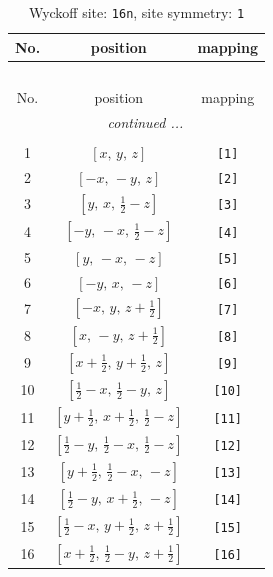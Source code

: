 \documentclass[fleqn,8pt]{jsarticle}
\begin{document}
\begin{longtable}{ccc}
\caption{Wyckoff site: {\tt 16n}, site symmetry: {\tt 1}}
 \\
 \hline \hline
No. & position & mapping \\ \hline \endfirsthead

\multicolumn{2}{l}{\tablename\ \thetable{}} \\
 \hline \hline
No. & position & mapping \\ \hline \endhead

 \hline \hline
\multicolumn{2}{r}{\footnotesize\it continued ...} \\ \endfoot

 \hline \hline
\multicolumn{2}{r}{} \\ \endlastfoot

1 & $\left[ x,\, y,\, z \right]$ & {\tt [1]} \\ \hline
2 & $\left[ - x,\, - y,\, z \right]$ & {\tt [2]} \\ \hline
3 & $\left[ y,\, x,\, \frac{1}{2} - z \right]$ & {\tt [3]} \\ \hline
4 & $\left[ - y,\, - x,\, \frac{1}{2} - z \right]$ & {\tt [4]} \\ \hline
5 & $\left[ y,\, - x,\, - z \right]$ & {\tt [5]} \\ \hline
6 & $\left[ - y,\, x,\, - z \right]$ & {\tt [6]} \\ \hline
7 & $\left[ - x,\, y,\, z + \frac{1}{2} \right]$ & {\tt [7]} \\ \hline
8 & $\left[ x,\, - y,\, z + \frac{1}{2} \right]$ & {\tt [8]} \\ \hline
9 & $\left[ x + \frac{1}{2},\, y + \frac{1}{2},\, z \right]$ & {\tt [9]} \\ \hline
10 & $\left[ \frac{1}{2} - x,\, \frac{1}{2} - y,\, z \right]$ & {\tt [10]} \\ \hline
11 & $\left[ y + \frac{1}{2},\, x + \frac{1}{2},\, \frac{1}{2} - z \right]$ & {\tt [11]} \\ \hline
12 & $\left[ \frac{1}{2} - y,\, \frac{1}{2} - x,\, \frac{1}{2} - z \right]$ & {\tt [12]} \\ \hline
13 & $\left[ y + \frac{1}{2},\, \frac{1}{2} - x,\, - z \right]$ & {\tt [13]} \\ \hline
14 & $\left[ \frac{1}{2} - y,\, x + \frac{1}{2},\, - z \right]$ & {\tt [14]} \\ \hline
15 & $\left[ \frac{1}{2} - x,\, y + \frac{1}{2},\, z + \frac{1}{2} \right]$ & {\tt [15]} \\ \hline
16 & $\left[ x + \frac{1}{2},\, \frac{1}{2} - y,\, z + \frac{1}{2} \right]$ & {\tt [16]} \\
\end{longtable}
\end{document}
